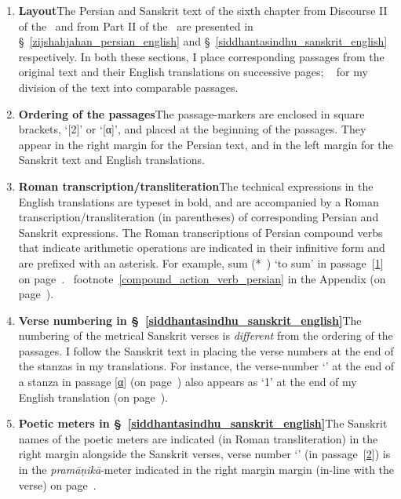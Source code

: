 \begin{enumerate}[topsep=0pt]
     \item \textbf{Layout}\quad The Persian and Sanskrit text of the sixth chapter from Discourse II of the \ZijiShahJahani\ and from Part II of the \Siddhantasindhu\ are presented in \S~\ref{zijshahjahan_persian_english} and \S~\ref{siddhantasindhu_sanskrit_english} respectively. In both these sections, I place corresponding passages from the original text and their English translations on successive pages; \vid\ <INSERT PAGE REFERENCE NOTE> for my division of the text into comparable passages.
    \item \textbf{Ordering of the passages}\quad The passage-markers are enclosed in square brackets, \eg `[2]' or `[α]', and placed at the beginning of the passages. They appear in the right margin for the Persian text, and in the left margin for the Sanskrit text and English translations. 
    \item \textbf{Roman transcription/transliteration}\quad The technical expressions in the English translations are typeset in bold, and are accompanied by a Roman transcription/transliteration (in parentheses) of corresponding Persian and Sanskrit expressions. The Roman transcriptions of Persian compound verbs that indicate arithmetic operations are indicated in their infinitive form and are prefixed with an asterisk. For example, \gls{sum} (*\jam\ \kardan) `to sum' in passage~[\hyperlink{PEpass1}{1}] on page~\pageref{passage_1_english_persian}. \Vid\ footnote~\ref{compound_action_verb_persian} in the Appendix (on page~\pageref{Appendix_verbs}).
    \item \textbf{Verse numbering in \S~\ref{siddhantasindhu_sanskrit_english}}\quad The numbering of the metrical Sanskrit verses is \textit{different} from the ordering of the passages. I follow the Sanskrit text in placing the verse numbers at the end of the stanzas in my translations. For instance, the verse-number `' at the end of a stanza in passage [\hyperlink{SpassA}{α}] (on page~\pageref{verse_1_label_sans_example}) also appears as `1' at the end of my English translation (on page~\pageref{verse_1_label_eng_example}).  
    \item \textbf{Poetic meters in \S~\ref{siddhantasindhu_sanskrit_english}}\quad The Sanskrit names of the poetic meters are indicated (in Roman transliteration) in the right margin alongside the Sanskrit verses, \eg verse number `' (in passage~[\hyperlink{Spass2}{2}]) is in the \textit{pramāṇikā}-meter indicated in the right margin margin (in-line with the verse) on page~\pageref{sanskrit_meter_typography_example}.

\end{enumerate}
